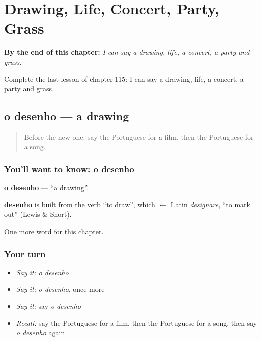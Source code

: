 
\chapter{Drawing, Life, Concert, Party, Grass}
\label{ch:pt-drawing-life-concert-party-grass}

\begin{chapteropening}
\textbf{By the end of this chapter:} \emph{I can say a drawing, life, a concert, a party and grass.}

Complete the last lesson of chapter 115: I can say a drawing, life, a concert, a party and grass.
\end{chapteropening}

\section[o desenho]{o desenho — a drawing}

\label{lesson:PT-C115-desenho}



\begin{quote}
Before the new one: say the Portuguese for a film, then the Portuguese for a song.
\end{quote}

\subsection*{You'll want to know: o desenho}
\textbf{o desenho} — \textquotedblleft{}a drawing\textquotedblright{}.

\begin{cousinweb}
\textbf{desenho} is built from the verb \textquotedblleft{}to draw\textquotedblright{}, which $\leftarrow$ Latin \emph{designare}, \textquotedblleft{}to mark out\textquotedblright{} (Lewis \& Short).
\end{cousinweb}

\begin{grammarlens}[title={What you've built}]
One more word for this chapter.
\end{grammarlens}

\subsection*{Your turn}
\begin{itemize}
\raggedright
  \item \emph{Say it:} \emph{o desenho}
  \item \emph{Say it:} \emph{o desenho}, once more
  \item \emph{Say it:} say \emph{o desenho}
  \item \emph{Recall:} say the Portuguese for a film, then the Portuguese for a song, then say \emph{o desenho} again
\end{itemize}

